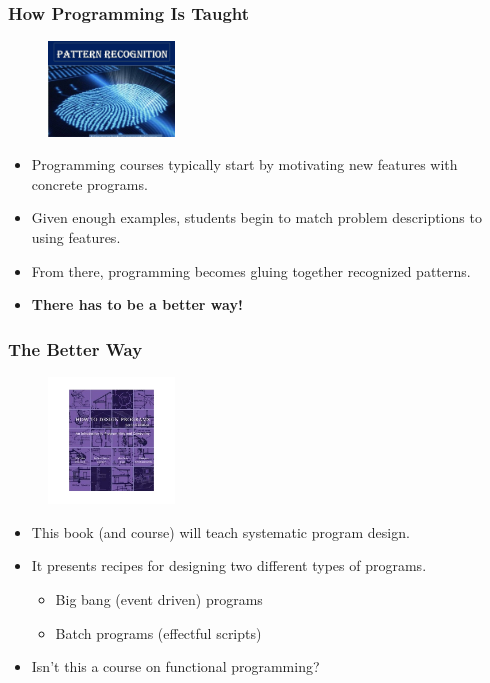 \documentclass{beamer}
\begin{document}
\begin{frame}
  \frametitle{How Programming Is Taught}
  \begin{figure}[t]
    \centering \includegraphics[width=0.3\textwidth]{images/pattern-recognition.jpg}
  \end{figure}
  \begin{itemize}
  \item<2-> Programming courses typically start by motivating new features with concrete programs.
  \item<3-> Given enough examples, students begin to match problem descriptions to using features.
  \item<4-> From there, programming becomes gluing together recognized patterns.
  \item<5-> \textbf{There has to be a better way!}
  \end{itemize}
\end{frame}

\begin{frame}
  \frametitle{The Better Way}
  \begin{figure}[t]
    \centering \includegraphics[width=0.3\textwidth]{images/htdp.jpeg}    
  \end{figure}
  \begin{itemize}
  \item<2-> This book (and course) will teach systematic program design.
  \item<3-> It presents recipes for designing two different types of programs.
    \begin{itemize}
    \item<4-> Big bang (event driven) programs
    \item<5-> Batch programs (effectful scripts)
    \end{itemize}
  \item<6-> Isn't this a course on functional programming?    
  \end{itemize}
\end{frame}
\end{document}
